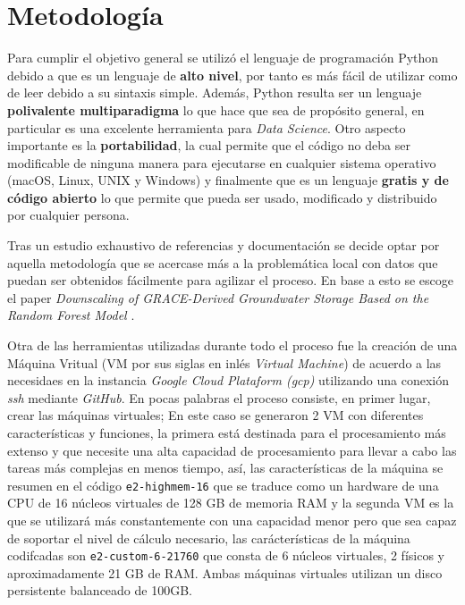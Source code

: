 \chapter{Metodología}
\label{C3}
Para cumplir el objetivo general se utilizó el lenguaje de programación Python debido a que es un lenguaje de \textbf{alto nivel}, por tanto es más fácil de utilizar como de leer debido a su sintaxis simple.
Además, Python resulta ser un lenguaje \textbf{polivalente multiparadigma} lo que hace que sea de propósito general, en particular es una excelente herramienta para \textit{Data Science}. Otro aspecto importante es la
\textbf{portabilidad}, la cual permite que el código no deba ser modificable de ninguna manera para ejecutarse en cualquier sistema operativo (macOS, Linux, UNIX y Windows) y finalmente que es un lenguaje
\textbf{gratis y de código abierto} lo que permite que pueda ser usado, modificado y distribuido por cualquier persona.

Tras un estudio exhaustivo de referencias y documentación se decide optar por aquella metodología
que se acercase más a la problemática local con datos que puedan ser obtenidos fácilmente para agilizar
el proceso. En base a esto se escoge el paper \textit{Downscaling of GRACE-Derived Groundwater Storage
Based on the Random Forest Model} \cite{11}. 

Otra de las herramientas utilizadas durante todo el proceso fue la creación de una Máquina Vritual (VM por sus siglas en inlés \textit{Virtual Machine}) de acuerdo a las necesidaes en la instancia
\textit{Google Cloud Plataform (gcp)}  utilizando una conexión \textit{ssh} mediante \textit{GitHub}. En pocas palabras el proceso consiste, en primer lugar, crear las máquinas virtuales;
En este caso se generaron 2 VM con diferentes características y funciones, la primera está destinada para el procesamiento más extenso y que necesite una alta capacidad de procesamiento para llevar a cabo las tareas más complejas en menos tiempo,
así, las características de la máquina se resumen en el código \texttt{e2-highmem-16} que se traduce como un hardware de una CPU de 16 núcleos virtuales de 128 GB de memoria RAM y la segunda VM es la que se utilizará
más constantemente con una capacidad menor pero que sea capaz de soportar el nivel de cálculo necesario, las carácterísticas de la máquina codifcadas son \texttt{e2-custom-6-21760} que consta de 6 núcleos virtuales,
2 físicos y aproximadamente 21 GB de RAM. Ambas máquinas virtuales utilizan un disco persistente balanceado de 100GB. 

